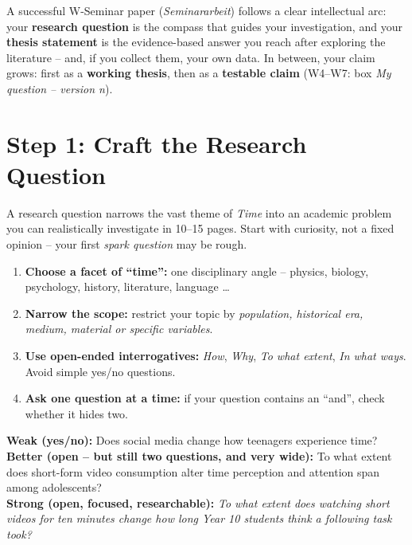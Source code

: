 \begin{minipage}[t]{0.84\linewidth}\vspace{0pt}
A successful W-Seminar paper (\emph{Seminararbeit}) follows a clear intellectual arc: your \textbf{research question} is the compass that guides your investigation, and your \textbf{thesis statement} is the evidence-based answer you reach after exploring the literature – and, if you collect them, your own data. In between, your claim grows: first as a \textbf{working thesis}, then as a \textbf{testable claim} (W4–W7: box \emph{My question – version n}).
\end{minipage}\hfill
\begin{minipage}[t]{0.13\linewidth}\vspace{0pt}\raggedleft
\qrcode[height=15mm]{\website}
\end{minipage}
\par\vspace{1.5mm}
\centerline{}

\section{Step 1: Craft the Research Question}

A research question narrows the vast theme of \emph{Time} into an academic problem you can realistically investigate in 10–15 pages. Start with curiosity, not a fixed opinion – your first \emph{spark question} may be rough.

\begin{enumerate}[leftmargin=1.4em, itemsep=0.05em]
\item \textbf{Choose a facet of “time”:} one disciplinary angle – physics, biology, psychology, history, literature, language …
\item \textbf{Narrow the scope:} restrict your topic by \emph{population, historical era, medium, material or specific variables}.
\item \textbf{Use open-ended interrogatives:} \emph{How}, \emph{Why}, \emph{To what extent}, \emph{In what ways}. Avoid simple yes/no questions.
\item \textbf{Ask one question at a time:} if your question contains an “and”, check whether it hides two.
\end{enumerate}

\begin{hinweis}
\textbf{Weak (yes/no):} Does social media change how teenagers experience time?\\[2pt]
\textbf{Better (open – but still two questions, and very wide):} To what extent does short-form video consumption alter time perception and attention span among adolescents?\\[2pt]
\textbf{Strong (open, focused, researchable):} \emph{To what extent does watching short videos for ten minutes change how long Year 10 students think a following task took?}
\end{hinweis}

